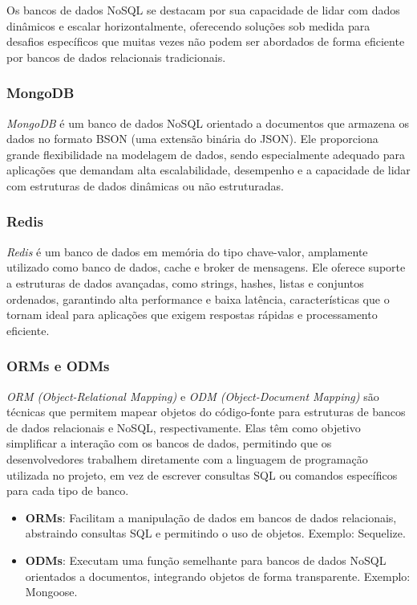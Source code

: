 Os bancos de dados NoSQL se destacam por sua capacidade de lidar com dados dinâmicos e escalar horizontalmente, oferecendo soluções sob medida para desafios específicos que muitas vezes não podem ser abordados de forma eficiente por bancos de dados relacionais tradicionais.

\subsubsection{MongoDB}

\emph{MongoDB} é um banco de dados NoSQL orientado a documentos que armazena os dados no formato BSON (uma extensão binária do JSON). Ele proporciona grande flexibilidade na modelagem de dados, sendo especialmente adequado para aplicações que demandam alta escalabilidade, desempenho e a capacidade de lidar com estruturas de dados dinâmicas ou não estruturadas.

\subsubsection{Redis}

\emph{Redis} é um banco de dados em memória do tipo chave-valor, amplamente utilizado como banco de dados, cache e broker de mensagens. Ele oferece suporte a estruturas de dados avançadas, como strings, hashes, listas e conjuntos ordenados, garantindo alta performance e baixa latência, características que o tornam ideal para aplicações que exigem respostas rápidas e processamento eficiente.


\subsubsection{ORMs e ODMs}

\emph{ORM (Object-Relational Mapping)} e \emph{ODM (Object-Document Mapping)} são técnicas que permitem mapear objetos do código-fonte para estruturas de bancos de dados relacionais e NoSQL, respectivamente. Elas têm como objetivo simplificar a interação com os bancos de dados, permitindo que os desenvolvedores trabalhem diretamente com a linguagem de programação utilizada no projeto, em vez de escrever consultas SQL ou comandos específicos para cada tipo de banco.\cite{orm-vs-odm}

\begin{itemize}
    \item \textbf{ORMs}: Facilitam a manipulação de dados em bancos de dados relacionais, abstraindo consultas SQL e permitindo o uso de objetos. Exemplo: Sequelize.
    \item \textbf{ODMs}: Executam uma função semelhante para bancos de dados NoSQL orientados a documentos, integrando objetos de forma transparente. Exemplo: Mongoose.
\end{itemize}

